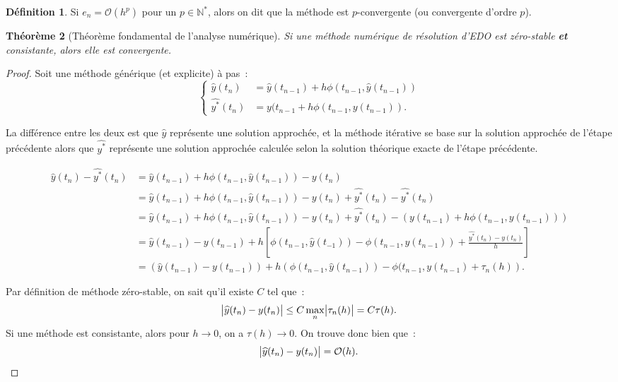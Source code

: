 \documentclass{article}
\newtheorem{thm}{Théorème}[section]
\theoremstyle{definition}
\newtheorem{déf}[thm]{Définition}
\theoremstyle{remark}
\newcommand{\N}{\mathbb N}
\begin{document}
		\begin{déf} Si $e_n = \mathcal O(h^p)$ pour un $p \in \N^*$, alors on dit que la méthode est $p$-convergente (ou convergente d'ordre $p$). \end{déf}

		\begin{thm}[Théorème fondamental de l'analyse numérique] Si une méthode numérique de résolution d'EDO est zéro-stable \textbf{et} consistante, alors
		elle est convergente.
		\end{thm}

		\begin{proof} Soit une méthode générique (et explicite) à pas~:
		\[\begin{cases}
			\widehat y(t_n) &= \widehat y(t_{n-1}) + h\phi(t_{n-1}, \widehat y(t_{n-1})) \\
			\widehat {y^*}(t_n) &= y(t_{n-1} + h\phi(t_{n-1}, y(t_{n-1})).
		\end{cases}\]

		La différence entre les deux est que $\widehat y$ représente une solution approchée, et la méthode itérative se base sur la solution approchée de l'étape
		précédente alors que $\widehat {y^*}$ représente une solution approchée calculée selon la solution théorique exacte de l'étape précédente.

		\begin{align*}
			\widehat y(t_n) - \widehat {y^*}(t_n) &= \widehat y(t_{n-1}) +h\phi(t_{n-1}, \widehat y(t_{n-1})) - y(t_n) \\
			&= \widehat y(t_{n-1}) + h\phi(t_{n-1}, \widehat y(t_{n-1})) - y(t_n) + \widehat {y^*}(t_n) - \widehat {y^*}(t_n) \\
			&= \widehat y(t_{n-1}) + h\phi(t_{n-1}, \widehat y(t_{n-1})) - y(t_n) + \widehat {y^*}(t_n) - \left(y(t_{n-1}) + h\phi(t_{n-1}, y(t_{n-1}))\right) \\
			&= \widehat y(t_{n-1}) - y(t_{n-1}) + h\left[\phi(t_{n-1}, \widehat y(t_{-1})) - \phi(t_{n-1}, y(t_{n-1})) + \frac {\widehat {y^*}(t_n) - y(t_n)}h\right] \\
			&= \left(\widehat y(t_{n-1}) - y(t_{n-1})\right) + h\left(\phi(t_{n-1}, \widehat y(t_{n-1})) - \phi(t_{n-1}, y(t_{n-1}) + \tau_n(h)\right).
		\end{align*}

		Par définition de méthode zéro-stable, on sait qu'il existe $C$ tel que~:
		\[\abs{\widehat y(t_n) - y(t_n)} \leq C\max_n\abs{\tau_n(h)} = C\tau(h).\]
		Si une méthode est consistante, alors pour $h \to 0$, on a $\tau(h) \to 0$. On trouve donc bien que~:
		\[\abs{\widehat y(t_n) - y(t_n)} =\mathcal O(h).\]
		\end{proof}
\end{document}
